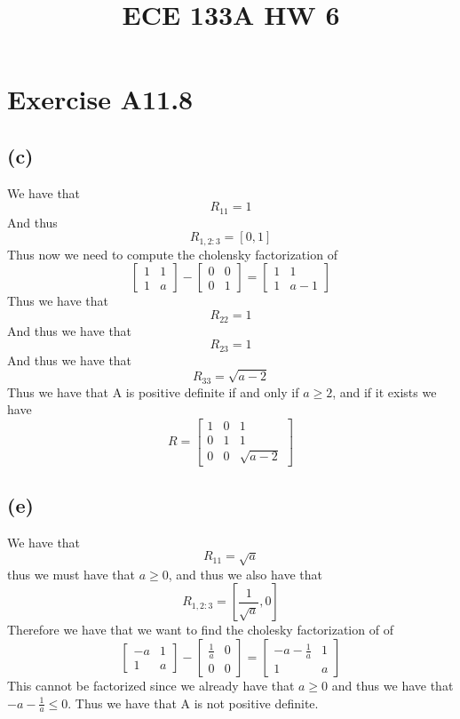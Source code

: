 
\title{ECE 133A HW 6}

\maketitle
\section*{Exercise A11.8}
\subsection*{(c)}
We have that 
$$R_11=1$$
And thus 
$$R_{1,2:3}=[0,1]$$
Thus now we need to compute the cholensky factorization of 
$$\begin{bmatrix}
    1 & 1\\
    1 & a
\end{bmatrix}-\begin{bmatrix}
    0 & 0\\
    0 & 1
\end{bmatrix}=\begin{bmatrix}
    1 & 1\\
    1 & a-1
\end{bmatrix}$$
Thus we have that 
$$R_{22}=1$$
And thus we have that 
$$R_{23}=1$$
And thus we have that
$$R_{33}=\sqrt{a-2}$$
Thus we have that A is positive definite if and only if $a\geq2$, and if it 
exists we have
$$R=\begin{bmatrix}
    1 & 0 & 1\\
    0 & 1 & 1\\
    0 & 0 & \sqrt{a-2}
\end{bmatrix}$$
\subsection*{(e)}
We have that 
$$R_11=\sqrt{a}$$
thus we must have that $a\geq 0$, and thus we also have that 
$$R_{1,2:3}=[\frac{1}{\sqrt{a}},0]$$
Therefore we have that we want to find the cholesky factorization of
of 
$$\begin{bmatrix}
    -a & 1\\
    1 & a
\end{bmatrix}-\begin{bmatrix}
    \frac{1}{a} & 0\\
    0 & 0
\end{bmatrix}=\begin{bmatrix}
    -a-\frac{1}{a} & 1\\
    1 & a
\end{bmatrix}$$
This cannot be factorized since we already have 
that $a\geq 0$ and thus we have that $-a-\frac{1}{a}\leq 0$. Thus we have
that A is not positive definite.
